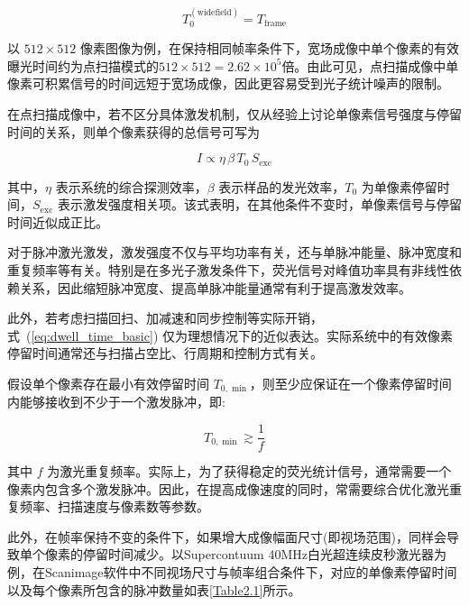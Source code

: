 \begin{equation}
T_0^{(\mathrm{widefield})}=T_{\mathrm{frame}}
\label{eq:widefield_exposure}
\end{equation}

以 $512\times512$ 像素图像为例，在保持相同帧率条件下，宽场成像中单个像素的有效曝光时间约为点扫描模式的$512\times512=2.62\times10^{5}$倍。由此可见，点扫描成像中单像素可积累信号的时间远短于宽场成像，因此更容易受到光子统计噪声的限制。

在点扫描成像中，若不区分具体激发机制，仅从经验上讨论单像素信号强度与停留时间的关系，则单个像素获得的总信号可写为

\begin{equation}
I \propto \eta \,\beta \,T_0\, S_{\mathrm{exc}}
\label{eq:signal_general}
\end{equation}

其中，$\eta$ 表示系统的综合探测效率，$\beta$ 表示样品的发光效率，$T_0$ 为单像素停留时间，$S_{\mathrm{exc}}$ 表示激发强度相关项。该式表明，在其他条件不变时，单像素信号与停留时间近似成正比。

对于脉冲激光激发，激发强度不仅与平均功率有关，还与单脉冲能量、脉冲宽度和重复频率等有关。特别是在多光子激发条件下，荧光信号对峰值功率具有非线性依赖关系，因此缩短脉冲宽度、提高单脉冲能量通常有利于提高激发效率。

此外，若考虑扫描回扫、加减速和同步控制等实际开销，式~(\ref{eq:dwell_time_basic}) 仅为理想情况下的近似表达。实际系统中的有效像素停留时间通常还与扫描占空比、行周期和控制方式有关。

假设单个像素存在最小有效停留时间 $T_{0,\min}$，则至少应保证在一个像素停留时间内能够接收到不少于一个激发脉冲，即:

\begin{equation}
T_{0,\min}\gtrsim \frac{1}{f}
\label{eq:min_dwell_time}
\end{equation}

其中 $f$ 为激光重复频率。实际上，为了获得稳定的荧光统计信号，通常需要一个像素内包含多个激发脉冲。因此，在提高成像速度的同时，常需要综合优化激光重复频率、扫描速度与像素数等参数。

此外，在帧率保持不变的条件下，如果增大成像幅面尺寸(即视场范围)，同样会导致单个像素的停留时间减少。以Supercontuum 40MHz白光超连续皮秒激光器为例，在Scanimage软件中不同视场尺寸与帧率组合条件下，对应的单像素停留时间以及每个像素所包含的脉冲数量如表\ref{Table2.1}所示。

